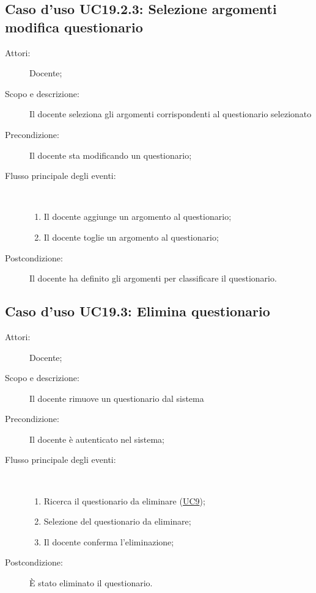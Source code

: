 \subsection{Caso d'uso UC19.2.3: Selezione argomenti modifica questionario}\begin{description}
	\item[Attori:] Docente;
	\item[Scopo e descrizione:] Il docente seleziona gli argomenti corrispondenti al questionario selezionato
	\item[Precondizione:] Il docente sta modificando un questionario;
	
	\item[Flusso principale degli eventi:] \ 
	\begin{enumerate}
		\item Il docente aggiunge un argomento al questionario;
		\item Il docente toglie un argomento al questionario;
		
	\end{enumerate}
	\item[Postcondizione:] Il docente ha definito gli argomenti per classificare il questionario.
\end{description}
\hypertarget{UC19.3}{}
\subsection{Caso d'uso UC19.3: Elimina questionario}\begin{description}
	\item[Attori:] Docente;
	\item[Scopo e descrizione:] Il docente rimuove un questionario dal sistema
	\item[Precondizione:] Il docente è autenticato nel sistema;
	
	\item[Flusso principale degli eventi:] \ 
	\begin{enumerate}
		\item Ricerca il questionario da eliminare (\hyperlink{UC9}{UC9});
		\item Selezione del questionario da eliminare;
		\item Il docente conferma l'eliminazione;
		
	\end{enumerate}
	\item[Postcondizione:] È stato eliminato il questionario.
\end{description}
\hypertarget{UC19.4}{}

